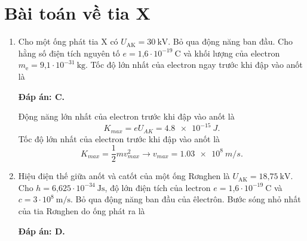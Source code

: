 \section{Bài toán về tia X}
\begin{enumerate}[label=\bfseries Câu \arabic*:]
	\item {} 
	
	\cauhoi
	{Cho một ống phát tia X có $U_\text{AK}=30\ \text{kV}$. Bỏ qua động năng ban đầu. Cho hằng số điện tích nguyên tố $e=\text{1,6}\cdot 10^{-19}\ \text{C}$ và khối lượng của electron $m_\text{e}=\text{9,1}\cdot 10^{-31}\ \text{kg}$. Tốc độ lớn nhất của electron ngay trước khi đập vào anốt là
	}
	
	\loigiai
	{		\textbf{Đáp án: C.}
		
Động năng lớn nhất của electron trước khi đập vào anốt là
$$
	K_{max} = eU_{AK} = \SI{4,8 e-15}{J}.
$$
Tốc độ lớn nhất của electron trước khi đập vào anốt là
$$
	K_{max} = \dfrac{1}{2}mv_{max}^{2} \rightarrow v_{max} = \SI{1,03 e8}{m/s}.
$$
		
	}
	
	\item {} 
	
	\cauhoi
	{Hiệu điện thế giữa anốt và catốt của một ống Rơnghen là $U_\text{AK}=\text{18,75}\ \text{kV}$. Cho $h=\text{6,625}\cdot 10^{-34}\ \text{Js}$, độ lớn điện tích của lectron $e=\text{1,6}\cdot 10^{-19}\ \text{C}$ và $c=3\cdot 10^8\ \text{m/s}$. Bỏ qua động năng ban đầu của êlectrôn. Bước sóng nhỏ nhất của tia Rơnghen do ống phát ra là
	}
	
	\loigiai
	{		\textbf{Đáp án: D.}
		
}
\end{enumerate}
